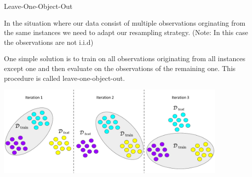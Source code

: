 \begin{vbframe}{Leave-One-Object-Out}

In the situation where our data consist of multiple observations 
orginating from the same instances we need to adapt our resampling strategy. 
(Note: In this case the observations are not i.i.d)

\lz

One simple solution is to train on all observations originating from all instances
except one and then evaluate on the observations of the remaining one. This
procedure is called leave-one-object-out.
\lz

\begin{knitrout}\scriptsize
{}\color{fgcolor}

{\centering \includegraphics[width=0.85\textwidth]{figure_man/loobject} 

}

\end{knitrout}
\end{vbframe}
\endlecture

